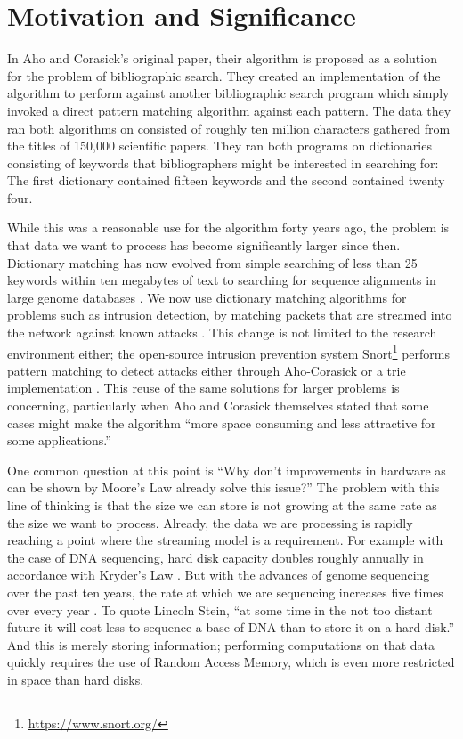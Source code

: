 \documentclass[ %
                    author={Dominic Joseph Moylett},
                    degree={MEng},
                     title={Dictionary Matching with Fingerprints},
                  subtitle={An Empirical Analysis},
                      type={research},
                      year={2015} ]{dissertation}
\begin{document}
\section{Motivation and Significance}

In Aho and Corasick's original paper, their algorithm is proposed as a solution for the problem of bibliographic search. They created an implementation of the algorithm to perform against another bibliographic search program which simply invoked a direct pattern matching algorithm against each pattern. The data they ran both algorithms on consisted of roughly ten million characters gathered from the titles of 150,000 scientific papers. They ran both programs on dictionaries consisting of keywords that bibliographers might be interested in searching for: The first dictionary contained fifteen keywords and the second contained twenty four.

While this was a reasonable use for the algorithm forty years ago, the problem is that data we want to process has become significantly larger since then. Dictionary matching has now evolved from simple searching of less than 25 keywords within ten megabytes of text to searching for sequence alignments in large genome databases \cite{15713233}. We now use dictionary matching algorithms for problems such as intrusion detection, by matching packets that are streamed into the network against known attacks \cite{1354682}. This change is not limited to the research environment either; the open-source intrusion prevention system Snort\footnote{\url{https://www.snort.org/}} performs pattern matching to detect attacks either through Aho-Corasick or a trie implementation \cite{website:snort-algo}. This reuse of the same solutions for larger problems is concerning, particularly when Aho and Corasick themselves stated that some cases might make the algorithm ``more space consuming and less attractive for some applications.'' \cite{Aho:1975:ESM:360825.360855}

One common question at this point is ``Why don't improvements in hardware as can be shown by Moore's Law \cite{658762} already solve this issue?'' The problem with this line of thinking is that the size we can store is not growing at the same rate as the size we want to process. Already, the data we are processing is rapidly reaching a point where the streaming model is a requirement. For example with the case of DNA sequencing, hard disk capacity doubles roughly annually in accordance with Kryder's Law \cite{scientificamerican0805-32}. But with the advances of genome sequencing over the past ten years, the rate at which we are sequencing increases five times over every year \cite{20622843}. To quote Lincoln Stein, ``at some time in the not too distant future it will cost less to sequence a base of DNA than to store it on a hard disk.'' \cite{20441614} And this is merely storing information; performing computations on that data quickly requires the use of Random Access Memory, which is even more restricted in space than hard disks.
\end{document}
